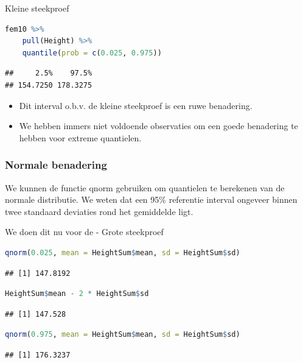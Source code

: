 \documentclass[
  12pt,dutch,coursenotes]{book}
\providecommand{\tightlist}{%
  \setlength{\itemsep}{0pt}\setlength{\parskip}{0pt}}
\begin{document}
Kleine steekproef

\begin{lstlisting}[language=R]
fem10 %>%
    pull(Height) %>%
    quantile(prob = c(0.025, 0.975))
\end{lstlisting}

\begin{lstlisting}
##     2.5%    97.5% 
## 154.7250 178.3275
\end{lstlisting}

\begin{itemize}
\tightlist
\item
  Dit interval o.b.v. de kleine steekproef is een ruwe benadering.
\item
  We hebben immers niet voldoende observaties om een goede benadering te hebben voor extreme quantielen.
\end{itemize}

\hypertarget{normale-benadering-1}{%
\subsubsection{Normale benadering}\label{normale-benadering-1}}

We kunnen de functie qnorm gebruiken om quantielen te berekenen van de normale distributie. We weten dat een 95\% referentie interval ongeveer binnen twee standaard deviaties rond het gemiddelde ligt.

We doen dit nu voor de
- Grote steekproef

\begin{lstlisting}[language=R]
qnorm(0.025, mean = HeightSum$mean, sd = HeightSum$sd)
\end{lstlisting}

\begin{lstlisting}
## [1] 147.8192
\end{lstlisting}

\begin{lstlisting}[language=R]
HeightSum$mean - 2 * HeightSum$sd
\end{lstlisting}

\begin{lstlisting}
## [1] 147.528
\end{lstlisting}

\begin{lstlisting}[language=R]
qnorm(0.975, mean = HeightSum$mean, sd = HeightSum$sd)
\end{lstlisting}

\begin{lstlisting}
## [1] 176.3237
\end{lstlisting}
\end{document}
